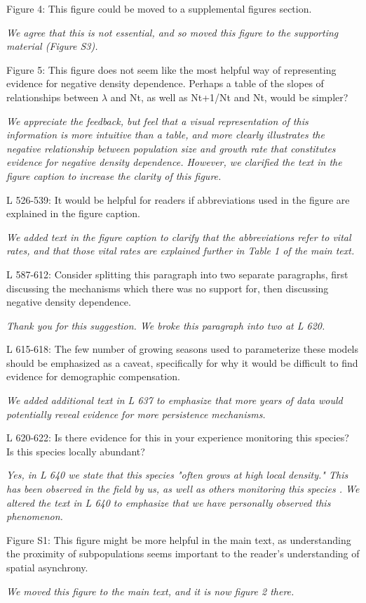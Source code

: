 \documentclass[12pt, letterpaper]{article}
\begin{document}
\begin{flushleft}
Figure 4: This figure could be moved to a supplemental figures section.

\textit{ We agree that this is not essential, and so moved this figure to the supporting material (Figure S3).}

Figure 5:  This figure does not seem like the most helpful way of representing evidence for negative density dependence. Perhaps a table of the slopes of relationships between $\lambda$ and Nt, as well as Nt+1/Nt and Nt, would be simpler?

\textit{We appreciate the feedback, but feel that a visual representation of this information is more intuitive than a table, and more clearly illustrates the negative relationship between population size and growth rate that constitutes evidence for negative density dependence. However, we clarified the text in the figure caption to increase the clarity of this figure. }

L 526-539: It would be helpful for readers if abbreviations used in the figure are explained in the figure caption.

\textit{We added text in the figure caption to clarify that the abbreviations refer to vital rates, and that those vital rates are explained further in Table 1 of the main text.  }

L 587-612: Consider splitting this paragraph into two separate paragraphs, first discussing the mechanisms which there was no support for, then discussing negative density dependence.

\textit{Thank you for this suggestion. We broke this paragraph into two at L 620.}
 
L 615-618: The few number of growing seasons used to parameterize these models should be emphasized as a caveat, specifically for why it would be difficult to find evidence for demographic compensation.

\textit{We added additional text in L 637 to emphasize that more years of data would potentially reveal evidence for more persistence mechanisms.}

L 620-622: Is there evidence for this in your experience monitoring this species? Is this species locally abundant?

\textit{Yes, in L 640 we state that this species "often grows at high local density." This has been observed in the field by us, as well as others monitoring this species \cite{Heidel202133-YearWyoming}. We altered the text in L 640 to emphasize that we have personally observed this phenomenon. }

Figure S1: This figure might be more helpful in the main text, as understanding the proximity of subpopulations seems important to the reader’s understanding of spatial asynchrony.

\textit{We moved this figure to the main text, and it is now figure 2 there.}

\end{flushleft}


\end{document}
